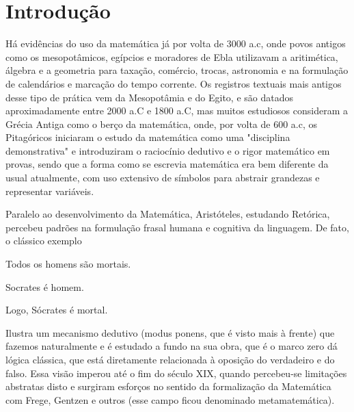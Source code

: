 \chapter{Introdução}


Há evidências do uso da matemática já por volta de 3000 a.c, onde povos antigos como os mesopotâmicos, egípcios e moradores de Ebla utilizavam a aritimética, álgebra e a geometria para taxação, comércio, trocas, astronomia e na formulação de calendários e marcação do tempo corrente.
Os registros textuais mais antigos desse tipo de prática vem da Mesopotâmia e do Egito, e são datados aproximadamente entre 2000 a.C e 1800 a.C, mas muitos estudiosos consideram a Grécia Antiga como o berço da matemática, onde, por volta de 600 a.c, os Pitagóricos iniciaram o estudo da matemática como uma "disciplina demonstrativa" e introduziram o raciocínio dedutivo e o rigor matemático em provas, sendo que a forma como se escrevia matemática era bem diferente da usual atualmente, com uso extensivo de símbolos para abstrair grandezas e representar variáveis.

Paralelo ao desenvolvimento da Matemática, Aristóteles, estudando Retórica, percebeu padrões na formulação frasal humana e cognitiva da linguagem. De fato, o clássico exemplo
\vspace{0.3cm}

Todos os homens são mortais. \par
Socrates é homem. \par
Logo, Sócrates é mortal.

\vspace{0.3cm}


Ilustra um mecanismo dedutivo (modus ponens, que é visto mais à frente) que fazemos naturalmente e é estudado a fundo na sua obra, que é o marco zero dá lógica clássica, que está diretamente relacionada à oposição do verdadeiro e do falso. Essa visão imperou até o fim do século XIX, quando percebeu-se limitações abstratas disto e surgiram esforços no sentido da formalização da Matemática com Frege, Gentzen e outros (esse campo ficou denominado metamatemática).

